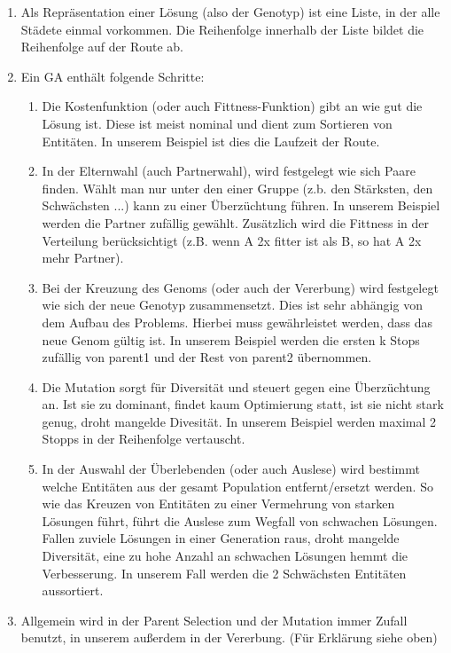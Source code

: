 \begin{enumerate}

	\item Als Repräsentation einer Lösung (also der Genotyp) ist eine Liste, in der alle Städete einmal vorkommen. Die Reihenfolge innerhalb der Liste bildet die Reihenfolge auf der Route ab.

	\item Ein GA enthält folgende Schritte:
	\begin{enumerate}
		\item Die Kostenfunktion (oder auch Fittness-Funktion) gibt an wie gut die Lösung ist. Diese ist meist nominal und dient zum Sortieren von Entitäten. In unserem Beispiel ist dies die Laufzeit der Route.
		\item In der Elternwahl (auch Partnerwahl), wird festgelegt wie sich Paare finden. Wählt man nur unter den einer Gruppe (z.b. den Stärksten, den Schwächsten ...) kann zu einer Überzüchtung führen. In unserem Beispiel werden die Partner zufällig gewählt. Zusätzlich wird die Fittness in der Verteilung berücksichtigt (z.B. wenn A 2x fitter ist als B, so hat A 2x mehr Partner).

		\item Bei der Kreuzung des Genoms (oder auch der Vererbung) wird festgelegt wie sich der neue Genotyp zusammensetzt. Dies ist sehr abhängig von dem Aufbau des Problems. Hierbei muss gewährleistet werden, dass das neue Genom gültig ist. In unserem Beispiel werden die ersten k Stops zufällig von parent1 und der Rest von parent2 übernommen. 
		\item Die Mutation sorgt für Diversität und steuert gegen eine Überzüchtung an. Ist sie zu dominant, findet kaum Optimierung statt, ist sie nicht stark genug, droht mangelde Divesität. In unserem Beispiel werden maximal 2 Stopps in der Reihenfolge vertauscht.

		\item In der Auswahl der Überlebenden (oder auch Auslese) wird bestimmt welche Entitäten aus der gesamt Population entfernt/ersetzt werden. So wie das Kreuzen von Entitäten zu einer Vermehrung von starken Lösungen führt, führt die Auslese zum Wegfall von schwachen  Lösungen. Fallen zuviele Lösungen in einer Generation raus, droht mangelde Diversität, eine zu hohe Anzahl an schwachen Lösungen hemmt die Verbesserung. In unserem Fall werden die 2 Schwächsten Entitäten aussortiert.
	\end{enumerate}
	
	\item Allgemein wird in der Parent Selection und der Mutation immer Zufall benutzt, in unserem außerdem in der Vererbung. (Für Erklärung siehe oben)


\end{enumerate}
